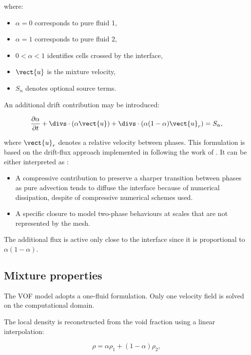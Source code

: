 where:

\begin{itemize}
\item $\alpha = 0$ corresponds to pure fluid 1,
\item $\alpha = 1$ corresponds to pure fluid 2,
\item $0 < \alpha < 1$ identifies cells crossed by the interface,
\item $\vect{u}$ is the mixture velocity,
\item $S_\alpha$ denotes optional source terms.
\end{itemize}

An additional drift contribution may be introduced:

\begin{equation}
\frac{\partial \alpha}{\partial t}
+\divs \cdot (\alpha \vect{u})
+\divs \cdot (\alpha (1-\alpha)\vect{u}_r)
=S_\alpha ,
\label{eq:vof:drift}
\end{equation}

where $\vect{u}_r$ denotes a relative velocity between phases.
This formulation is based on the drift-flux approach implemented in \CS
following the work of \cite{deshpande:2012}.
It can be either interpreted as :
\begin{itemize}
  \item A compressive contribution to preserve a sharper transition between
    phases as pure advection tends to diffuse the interface because of
    numerical dissipation, despite of compressive
    numerical schemes used.
  \item A specific closure to model two-phase behaviours at scales that are not
    represented by the mesh.
\end{itemize}
The additional flux is active only close to the interface since it is
proportional to $\alpha(1-\alpha)$.


\subsection{Mixture properties}

The VOF model adopts a one-fluid formulation.
Only one velocity field is solved on the computational domain.

The local density is reconstructed from the void fraction using a
linear interpolation:

\begin{equation}
\rho=\alpha \rho_1+(1-\alpha)\rho_2 ,
\label{eq:vof:rho_mix}
\end{equation}

